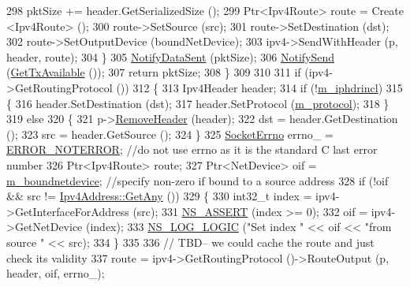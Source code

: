 \begin{DoxyCode}
298           pktSize += header.GetSerializedSize ();
299           Ptr<Ipv4Route> route = Create <Ipv4Route> ();
300           route->SetSource (src);
301           route->SetDestination (dst);
302           route->SetOutputDevice (boundNetDevice);
303           ipv4->SendWithHeader (p, header, route);
304         \}
305       \hyperlink{classns3_1_1Socket_ae478fc503f7041a1da5e9db361f1ae20}{NotifyDataSent} (pktSize);
306       \hyperlink{classns3_1_1Socket_a34cd5de5b9feeadd6ba8973b954c3d5f}{NotifySend} (\hyperlink{classns3_1_1Ipv4RawSocketImpl_afa925ad3c6fef990ec72b4ee5c0cbc2b}{GetTxAvailable} ());
307       \textcolor{keywordflow}{return} pktSize;
308     \}
309 
310 
311   \textcolor{keywordflow}{if} (ipv4->GetRoutingProtocol ())
312     \{
313       Ipv4Header header;
314       \textcolor{keywordflow}{if} (!\hyperlink{classns3_1_1Ipv4RawSocketImpl_a895d0929c6fb2c111f99e83a8b7516fc}{m\_iphdrincl})
315         \{
316           header.SetDestination (dst);
317           header.SetProtocol (\hyperlink{classns3_1_1Ipv4RawSocketImpl_a924effb0eb9a6cbbf1daeb3a7b7ffc94}{m\_protocol});
318         \}
319       \textcolor{keywordflow}{else}
320         \{
321           p->\hyperlink{classns3_1_1Packet_a0961eccf975d75f902d40956c93ba63e}{RemoveHeader} (header);
322           dst = header.GetDestination ();
323           src = header.GetSource ();
324         \}
325       \hyperlink{classns3_1_1Socket_ada1328c5ae0c28cb2a982caf8f6d6cca}{SocketErrno} errno\_ = \hyperlink{classns3_1_1Socket_ada1328c5ae0c28cb2a982caf8f6d6ccaaa7eb006d73c5ad0117c5591fcb3469f7}{ERROR\_NOTERROR}; \textcolor{comment}{//do not use errno as it is the
       standard C last error number}
326       Ptr<Ipv4Route> route;
327       Ptr<NetDevice> oif = \hyperlink{classns3_1_1Socket_a9781d8dfdb5e9364d5dce8f53b768bb5}{m\_boundnetdevice}; \textcolor{comment}{//specify non-zero if bound to a source
       address}
328       \textcolor{keywordflow}{if} (!oif && src != \hyperlink{classns3_1_1Ipv4Address_a7a39b330c8e701183a411d5779fca1a4}{Ipv4Address::GetAny} ())
329         \{
330           int32\_t index = ipv4->GetInterfaceForAddress (src);
331           \hyperlink{assert_8h_a6dccdb0de9b252f60088ce281c49d052}{NS\_ASSERT} (index >= 0);
332           oif = ipv4->GetNetDevice (index);
333           \hyperlink{group__logging_ga88acd260151caf2db9c0fc84997f45ce}{NS\_LOG\_LOGIC} (\textcolor{stringliteral}{"Set index "} << oif << \textcolor{stringliteral}{"from source "} << src);
334         \}
335 
336       \textcolor{comment}{// TBD-- we could cache the route and just check its validity}
337       route = ipv4->GetRoutingProtocol ()->RouteOutput (p, header, oif, errno\_);

\end{DoxyCode}
